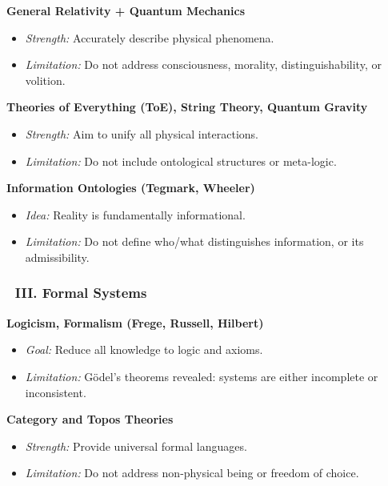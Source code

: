\documentclass[12pt]{article}
\begin{document}
\textbf{General Relativity + Quantum Mechanics}

\begin{itemize}
\item \textit{Strength:} Accurately describe physical phenomena.
\item \textit{Limitation:} Do not address consciousness, morality, distinguishability, or volition.
\end{itemize}

\textbf{Theories of Everything (ToE), String Theory, Quantum Gravity}

\begin{itemize}
\item \textit{Strength:} Aim to unify all physical interactions.
\item \textit{Limitation:} Do not include ontological structures or meta-logic.
\end{itemize}

\textbf{Information Ontologies (Tegmark, Wheeler)}

\begin{itemize}
\item \textit{Idea:} Reality is fundamentally informational.
\item \textit{Limitation:} Do not define who/what distinguishes information, or its admissibility.
\end{itemize}

\subsubsection*{🔹 III. Formal Systems}

\textbf{Logicism, Formalism (Frege, Russell, Hilbert)}

\begin{itemize}
\item \textit{Goal:} Reduce all knowledge to logic and axioms.
\item \textit{Limitation:} Gödel’s theorems revealed: systems are either incomplete or inconsistent.
\end{itemize}

\textbf{Category and Topos Theories}

\begin{itemize}
\item \textit{Strength:} Provide universal formal languages.
\item \textit{Limitation:} Do not address non-physical being or freedom of choice.
\end{itemize}
\end{document}
